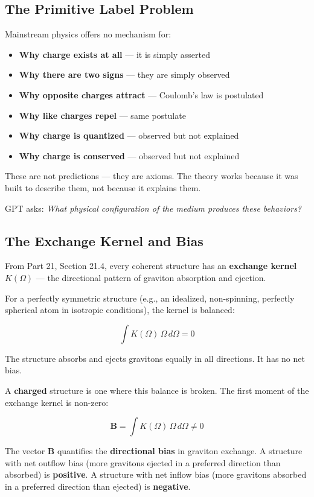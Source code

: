 \documentclass[12pt, a4paper]{article}
\begin{document}
\subsection{The Primitive Label Problem}
\label{subsec:charge_problem}

Mainstream physics offers no mechanism for:
\begin{itemize}
    \item \textbf{Why charge exists at all} — it is simply asserted
    \item \textbf{Why there are two signs} — they are simply observed
    \item \textbf{Why opposite charges attract} — Coulomb's law is postulated
    \item \textbf{Why like charges repel} — same postulate
    \item \textbf{Why charge is quantized} — observed but not explained
    \item \textbf{Why charge is conserved} — observed but not explained
\end{itemize}

These are not predictions — they are axioms. The theory works because it was built to describe them, not because it explains them.

GPT asks: \textit{What physical configuration of the medium produces these behaviors?}

\subsection{The Exchange Kernel and Bias}
\label{subsec:exchange_kernel}

From Part 21, Section 21.4, every coherent structure has an \textbf{exchange kernel} \( K(\Omega) \) — the directional pattern of graviton absorption and ejection.

For a perfectly symmetric structure (e.g., an idealized, non-spinning, perfectly spherical atom in isotropic conditions), the kernel is balanced:

\[
\int K(\Omega) \, \Omega \, d\Omega = 0
\]

The structure absorbs and ejects gravitons equally in all directions. It has no net bias.

A \textbf{charged} structure is one where this balance is broken. The first moment of the exchange kernel is non-zero:

\[
\mathbf{B} = \int K(\Omega) \, \Omega \, d\Omega \neq 0
\]

The vector \( \mathbf{B} \) quantifies the \textbf{directional bias} in graviton exchange. A structure with net outflow bias (more gravitons ejected in a preferred direction than absorbed) is \textbf{positive}. A structure with net inflow bias (more gravitons absorbed in a preferred direction than ejected) is \textbf{negative}.
\end{document}
